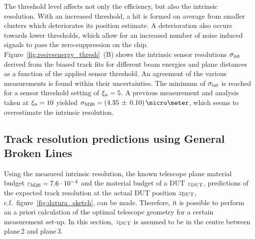 The threshold level affects not only the efficiency, but also the intrinsic resolution. 
With an increased threshold, a hit is formed on average from smaller clusters which deteriorates its position estimate. 
A deterioration also occurs towards lower thresholds, which allow for an increased number of noise induced signals to pass the zero-suppression on the chip.
Figure~\ref{fig:resivsenergy_thresh}~(B) shows the intrinsic sensor resolutions $\sigma_{\textrm{int}}$ derived from the biased track fits
 for different beam energies and plane distances as a function of the applied sensor threshold.
An agreement of the various measurements is found within their uncertainties. 
The minimum of $\sigma_{\textrm{int}}$ is reached for a sensor threshold setting of $\xi_{\textrm{n}} = 5$.
A previous measurement and analysis~\cite{ref:j.behrmeasurements} taken at $\xi_{\textrm{n}} = 10$ yielded $\sigma_{\textrm{M26}} = (4.35\,\pm\,0.10)\,\micro\meter$,
 which seems to overestimate the intrinsic resolution. 



\subsection{Track resolution predictions using General Broken Lines}

% 
Using the measured intrinsic resolution, the known telescope plane material budget $\mathnormal{\varepsilon_{\textrm{M26}}} = 7.6\cdot 10^{-4}$ and the material budget of a DUT $\mathnormal{\varepsilon_{\textrm{DUT}}}$,
 predictions of the expected track resolution at the actual DUT position $z_{\textrm{DUT}}$, c.f.\ figure~\ref{fig:datura_sketch}, can be made.
Therefore, it is possible to perform an a priori calculation of the optimal telescope geometry for a certain measurement set-up. 
In this section, $z_{\textrm{DUT}}$ is assumed to be in the centre between plane\,2 and plane\,3.

